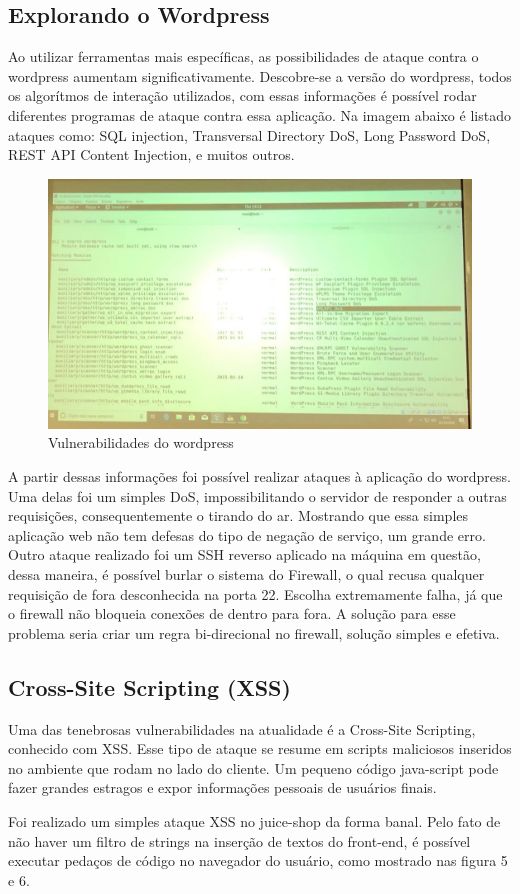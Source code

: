 \documentclass[journal]{IEEEtran}
\begin{document}
\subsection{Explorando o Wordpress}
Ao utilizar ferramentas mais específicas, as possibilidades de ataque contra o wordpress aumentam significativamente. Descobre-se a versão do wordpress, todos os algorítmos de interação utilizados, com essas informações é possível rodar diferentes programas de ataque contra essa aplicação. Na imagem abaixo é listado ataques como: SQL injection, Transversal Directory DoS, Long Password DoS, REST API Content Injection, e muitos outros.

\begin{figure}[h!]
	\includegraphics[width=\linewidth]{../fotos/wpscan/IMG_8233.JPG}
	\caption{Vulnerabilidades do wordpress}
	\label{fig:wordpress_vulnerabilities}
\end{figure}

A partir dessas informações foi possível realizar ataques à aplicação do wordpress. Uma delas foi um simples DoS, impossibilitando o servidor de responder a outras requisições, consequentemente o tirando do ar. Mostrando que essa simples aplicação web não tem defesas do tipo de negação de serviço, um grande erro. Outro ataque realizado foi um SSH reverso aplicado na máquina em questão, dessa maneira, é possível burlar o sistema do Firewall, o qual recusa qualquer requisição de fora desconhecida na porta 22. Escolha extremamente falha, já que o firewall não bloqueia conexões de dentro para fora. A solução para esse problema seria criar um regra bi-direcional no firewall, solução simples e efetiva.

\subsection{Cross-Site Scripting (XSS)}
Uma das tenebrosas vulnerabilidades na atualidade é a Cross-Site Scripting, conhecido com XSS. Esse tipo de ataque se resume em scripts maliciosos inseridos no ambiente que rodam no lado do cliente. Um pequeno código java-script pode fazer grandes estragos e expor informações pessoais de usuários finais.\par
Foi realizado um simples ataque XSS no juice-shop da forma banal. Pelo fato de não haver um filtro de strings na inserção de textos do front-end, é possível executar pedaços de código no navegador do usuário, como mostrado nas figura 5 e 6.
\end{document}
